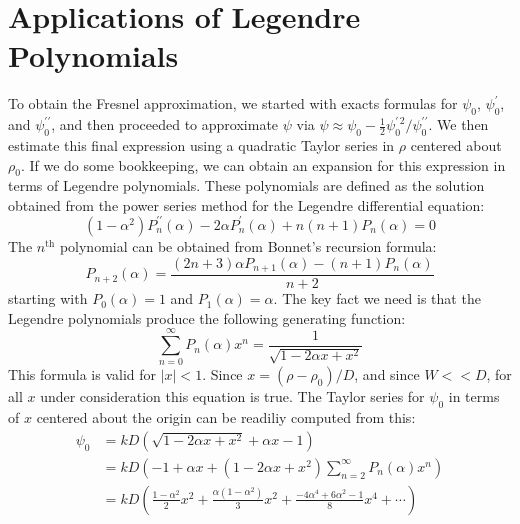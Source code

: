 \documentclass{article}
\begin{document}
    \section{Applications of Legendre Polynomials}
        To obtain the Fresnel approximation, we started with exacts formulas
        for $\psi_{0}$, $\psi^{\prime}_{0}$, and $\psi^{\prime\prime}_{0}$,
        and then proceeded to approximate $\psi$ via
        $%
            \psi\approx%
            \psi_{0}-\frac{1}{2}\psi^{\prime\,2}_{0}/\psi^{\prime\prime}_{0}%
        $.
        We then estimate this final expression using a quadratic
        Taylor series in $\rho$ centered about $\rho_{0}$. If we do some
        bookkeeping, we can obtain an expansion for this expression in terms of
        Legendre polynomials. These polynomials are defined as the
        solution obtained from the power series method for the Legendre
        differential equation:
        \begin{equation}
            (1-\alpha^{2})P^{\prime\prime}_{n}(\alpha)
            -2\alpha{P}^{\prime}_{n}(\alpha)
            +n(n+1)P_{n}(\alpha)=0
        \end{equation}
        The $n^{\textrm{th}}$ polynomial can be obtained from Bonnet's
        recursion formula:
        \begin{equation}
            P_{n+2}(\alpha)
            =\frac{(2n+3)\alpha{P}_{n+1}(\alpha)-(n+1)P_{n}(\alpha)}{n+2}
        \end{equation}
        starting with $P_{0}(\alpha)=1$ and $P_{1}(\alpha)=\alpha$.
        The key fact we need is that the Legendre polynomials produce
        the following generating function:
        \begin{equation}
            \sum_{n=0}^{\infty}P_{n}(\alpha)x^{n}
            =\frac{1}{\sqrt{1-2\alpha{x}+x^{2}}}
        \end{equation}
        This formula is valid for $|x|<1$. Since $x=(\rho-\rho_{0})/D$, and
        since $W<<D$, for all $x$ under consideration this equation is true.
        The Taylor series for $\psi_{0}$ in terms of $x$ centered about
        the origin can be readiliy computed from this:
        \begin{subequations}
            \begin{align}
                \psi_{0}
                &=kD\left(\sqrt{1-2\alpha{x}+x^{2}}+\alpha{x}-1\right)\\
                &=kD\left(
                    -1+\alpha{x}+
                    (1-2\alpha{x}+x^{2})\sum_{n=2}^{\infty}P_{n}(\alpha)x^{n}
                \right)\\
                &=kD\left(
                    \frac{1-\alpha^{2}}{2}x^{2}
                    +\frac{\alpha(1-\alpha^{2})}{3}x^{2}
                    +\frac{-4\alpha^{4}+6\alpha^{2}-1}{8}x^{4}
                    +\cdots
                \right)
            \end{align}
        \end{subequations}
\end{document}
